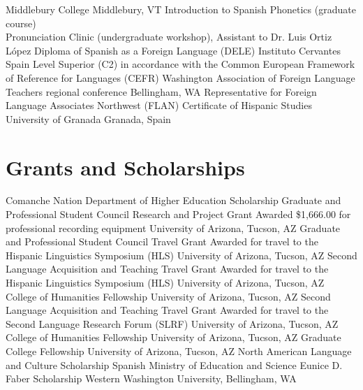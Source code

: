 \documentclass[11pt,letterpaper]{moderncv}
\begin{document}
        {Middlebury College}
        {Middlebury, VT}
        {}
        {Introduction to Spanish Phonetics (graduate course)\\ Pronunciation Clinic (undergraduate workshop), Assistant to Dr. Luis Ortiz L\'opez}
        {Diploma of Spanish as a Foreign Language (DELE)}
        {Instituto Cervantes}
        {Spain}
        {}
        {Level Superior (C2) in accordance with the Common European Framework of Reference for Languages (CEFR)}
        {Washington Association of Foreign Language Teachers regional conference}
        {Bellingham, WA}
        {}
        {}
        {Representative for Foreign Language Associates Northwest (FLAN)}
        {}
        {Certificate of Hispanic Studies}
        {University of Granada}
        {Granada, Spain}
        {}
        {}
        {}




\section{Grants and Scholarships}

        {Comanche Nation Department of Higher Education Scholarship}
        {}
        {}
        {}
        {}
        {}
        {Graduate and Professional Student Council Research and Project Grant}
        {\newline Awarded \$1,666.00 for professional recording equipment}
        {}
        {}
        {University of Arizona, Tucson, AZ}
        {Graduate and Professional Student Council Travel Grant}
        {\newline Awarded for travel to the Hispanic Linguistics Symposium (HLS)}
        {}
        {}
        {University of Arizona, Tucson, AZ}
        {Second Language Acquisition and Teaching Travel Grant}
        {\newline Awarded for travel to the Hispanic Linguistics Symposium (HLS)}
        {}
        {}
        {University of Arizona, Tucson, AZ}
        {College of Humanities Fellowship}
        {}
        {}
        {}
        {University of Arizona, Tucson, AZ}
        {Second Language Acquisition and Teaching Travel Grant}
        {\newline Awarded for travel to the Second Language Research Forum (SLRF)}
        {}
        {}
        {University of Arizona, Tucson, AZ}
        {College of Humanities Fellowship}
        {}
        {}
        {}
        {University of Arizona, Tucson, AZ}
        {Graduate College Fellowship}
        {}
        {}
        {}
        {University of Arizona, Tucson, AZ}
        {North American Language and Culture Scholarship}
        {}
        {}
        {}
        {Spanish Ministry of Education and Science}
        {Eunice D. Faber Scholarship}
        {}
        {}
        {}
        {Western Washington University, Bellingham, WA}
\end{document}
